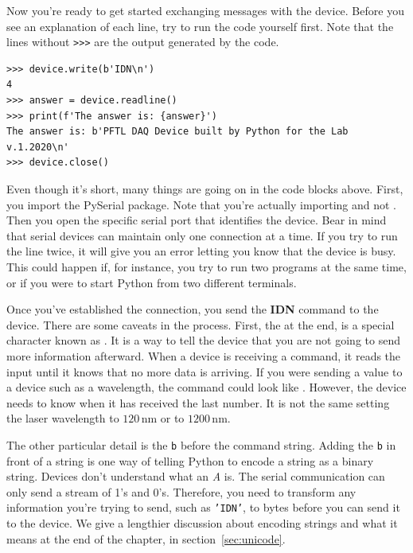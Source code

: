 Now you're ready to get started exchanging messages with the device. Before you see an explanation of each line, try to run the code yourself first. Note that the lines without \texttt{>>>} are the output generated by the code.

\begin{verbatim}
>>> device.write(b'IDN\n')
4
>>> answer = device.readline()
>>> print(f'The answer is: {answer}')
The answer is: b'PFTL DAQ Device built by Python for the Lab v.1.2020\n'
>>> device.close()
\end{verbatim}

Even though it's short, many things are going on in the code blocks above. First, you import the PySerial package. Note that you're actually importing  and not . Then you open the specific serial port that identifies the device. Bear in mind that serial devices can maintain only one connection at a time. If you try to run the line twice, it will give you an error letting you know that the device is busy. This could happen if, for instance, you try to run two programs at the same time, or if you were to start Python from two different terminals.

Once you've established the connection, you send the \textbf{{IDN}} command to the device. There are some caveats in the process. First, the \texttt{\n} at the end, is a special character known as . It is a way to tell the device that you are
not going to send more information afterward. When a device is receiving a command, it reads the input until it knows that no more data is arriving. If you were sending a value to a device such as a wavelength, the command could look like . However, the device needs to know when it has received the last number. It is not the same setting the laser wavelength to $120\,\textrm{nm}$ or to $1200\,\textrm{nm}$.

The other particular detail is the \texttt{b} before the command string. Adding the \texttt{b} in front of a string is one way of telling Python to encode a string as a binary string. Devices don't understand what an \textit{A} is. The serial communication can only send a stream of 1's and 0's. Therefore, you need to transform any information you're trying to send, such as \texttt{'IDN'}, to bytes before you can send it to the device. We give a lengthier discussion about encoding strings and what it means at the end of the chapter, in section~\ref{sec:unicode}.

